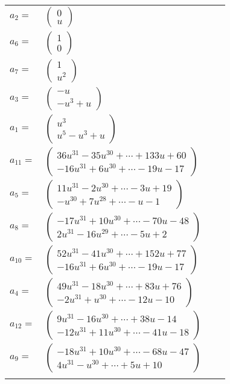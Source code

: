 \documentclass[1p]{elsarticle_modified}
\theoremstyle{definition}
\begin{document}
\begin{tabular}{m{7pt} m{180pt} m{7pt} m{180pt} }
\flushright $a_{2}=$&$\begin{pmatrix}0\\u\end{pmatrix}$ \\
\flushright $a_{6}=$&$\begin{pmatrix}1\\0\end{pmatrix}$ \\
\flushright $a_{7}=$&$\begin{pmatrix}1\\u^2\end{pmatrix}$ \\
\flushright $a_{3}=$&$\begin{pmatrix}- u\\- u^3+u\end{pmatrix}$ \\
\flushright $a_{1}=$&$\begin{pmatrix}u^3\\u^5- u^3+u\end{pmatrix}$ \\
\flushright $a_{11}=$&$\begin{pmatrix}36 u^{31}-35 u^{30}+\cdots+133 u+60\\-16 u^{31}+6 u^{30}+\cdots-19 u-17\end{pmatrix}$ \\
\flushright $a_{5}=$&$\begin{pmatrix}11 u^{31}-2 u^{30}+\cdots-3 u+19\\- u^{30}+7 u^{28}+\cdots- u-1\end{pmatrix}$ \\
\flushright $a_{8}=$&$\begin{pmatrix}-17 u^{31}+10 u^{30}+\cdots-70 u-48\\2 u^{31}-16 u^{29}+\cdots-5 u+2\end{pmatrix}$ \\
\flushright $a_{10}=$&$\begin{pmatrix}52 u^{31}-41 u^{30}+\cdots+152 u+77\\-16 u^{31}+6 u^{30}+\cdots-19 u-17\end{pmatrix}$ \\
\flushright $a_{4}=$&$\begin{pmatrix}49 u^{31}-18 u^{30}+\cdots+83 u+76\\-2 u^{31}+u^{30}+\cdots-12 u-10\end{pmatrix}$ \\
\flushright $a_{12}=$&$\begin{pmatrix}9 u^{31}-16 u^{30}+\cdots+38 u-14\\-12 u^{31}+11 u^{30}+\cdots-41 u-18\end{pmatrix}$ \\
\flushright $a_{9}=$&$\begin{pmatrix}-18 u^{31}+10 u^{30}+\cdots-68 u-47\\4 u^{31}- u^{30}+\cdots+5 u+10\end{pmatrix}$\\&\end{tabular}
\end{document}

